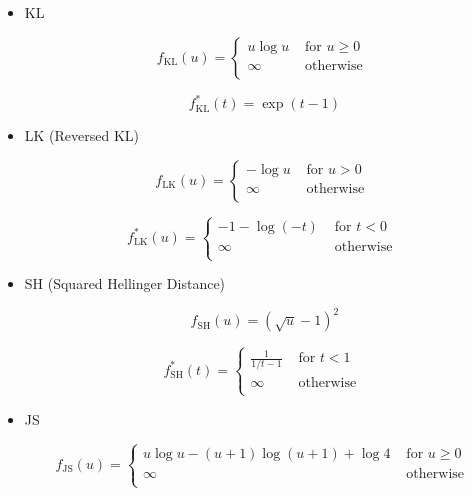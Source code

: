 \begin{example}
    \begin{itemize}
        \item
        KL

        $$
        f_{\mathrm{KL}}(u)=
        \begin{cases}
        u \log u & \text { for } u \geq 0 \\
        \infty & \text { otherwise } \\
        \end{cases}
        $$

        $$
        f_{\mathrm{KL}}^{*}(t)=\exp(t-1)
        $$
        \item
        LK (Reversed KL)

        $$
        f_{\mathrm{LK}}(u)=
        \begin{cases}
        - 
            \log u & \text { for } u > 0 \\
        \infty & \text { otherwise } \\
        \end{cases}
        $$

        $$
        f_{\mathrm{LK}}^{*}(u)=
        \begin{cases}
        -1-\log(-t) & \text { for } t < 0 \\
        \infty & \text { otherwise } \\
        \end{cases}
        $$
        \item
        SH (Squared Hellinger Distance)

        $$
        f_{\mathrm{SH}}(u)=(\sqrt{u}-1)^2
        $$

        $$
        f_{\mathrm{SH}}^{*}(t)=
        \begin{cases}
        \frac{1}{1/t-1} & \text { for } t < 1 \\
        \infty & \text { otherwise } \\
        \end{cases}
        $$
        \item
        JS

        $$
        f_{\mathrm{JS}}(u)=
        \begin{cases}
        u\log u-(u+1) \log (u+1)+\log 4 & \text { for } u \geq 0 \\
        \infty & \text { otherwise } \\
        \end{cases}
        $$


\end{itemize}
\end{example}
